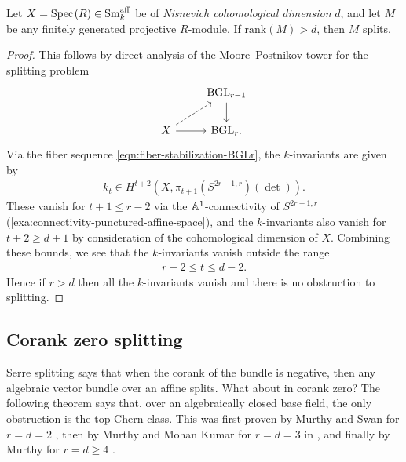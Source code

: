 \documentclass[11pt,openany]{book}
\providecommand{\aff}{\mathrm{aff}}
\begin{document}
\begin{theorem} Let $X = \Spec(R)\in \Sm_k^\aff$ be of \textit{Nisnevich cohomological dimension} $d$, and let $M$ be any finitely generated projective $R$-module. If $\text{rank}(M) > d$, then $M$ splits.
\end{theorem}
\begin{proof} This follows by direct analysis of the Moore--Postnikov tower for the splitting problem
\[ \begin{tikzcd}
     & \BGL_{r-1}\dar\\
    X\rar\ar[ur,dashed] & \BGL_r.
\end{tikzcd} \]
Via the fiber sequence \autoref{eqn:fiber-stabilization-BGLr}, the $k$-invariants are given by
\begin{align*}
    k_t \in H^{t+2}(X, \pi_{t+1}(S^{2r-1,r})(\det)).
\end{align*}
These vanish for $t+1\le r-2$ via the $\mathbb{A}^1$-connectivity of $S^{2r-1,r}$ (\autoref{exa:connectivity-punctured-affine-space}), and the $k$-invariants also vanish for $t+2 \ge d+1$ by consideration of the cohomological dimension of $X$. Combining these bounds, we see that the $k$-invariants vanish outside the range
\begin{align*}
    r-2 \le t \le d-2.
\end{align*}
Hence if $r>d$ then all the $k$-invariants vanish and there is no obstruction to splitting.
\end{proof}

\subsection{Corank zero splitting}

Serre splitting says that when the corank of the bundle is negative, then any algebraic vector bundle over an affine splits. What about in corank zero? The following theorem says that, over an algebraically closed base field, the only obstruction is the top Chern class. This was first proven by Murthy and Swan for $r=d=2$ \cite{MurthySwan}, then by Murthy and Mohan Kumar for $r=d=3$ in \cite{KumarMurthy}, and finally by Murthy for $r=d\ge4$ \cite{Murthy94}.
\end{document}
